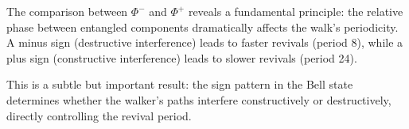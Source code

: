 The comparison between $\Phi^-$ and $\Phi^+$ reveals a fundamental
principle: the relative phase between entangled components dramatically
affects the walk's periodicity. A minus sign (destructive interference)
leads to faster revivals (period 8), while a plus sign (constructive
interference) leads to slower revivals (period 24).

This is a subtle but important result: the sign pattern in the Bell
state determines whether the walker's paths interfere constructively or
destructively, directly controlling the revival period.
